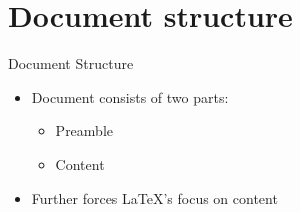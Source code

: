 \documentclass{beamer}
\begin{document}


\section{Document structure}
\begin{frame}{Document Structure}
    \begin{itemize}
        \item Document consists of two parts:
              \begin{itemize}
                  \item Preamble
                  \item Content
              \end{itemize}
        \item Further forces \LaTeX{}'s focus on content
    \end{itemize}
\end{frame}
\end{document}
